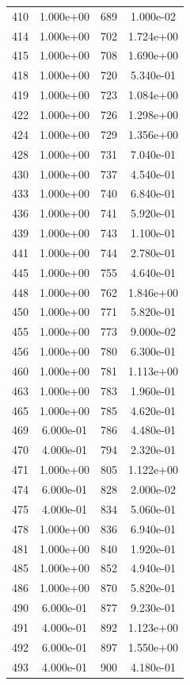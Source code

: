 \documentclass[12pt]{article}
\begin{document}
\begin{longtable}{@{}cccc@{}}
410 & 1.000e+00 & 689 & 1.000e-02 \\
414 & 1.000e+00 & 702 & 1.724e+00 \\
415 & 1.000e+00 & 708 & 1.690e+00 \\
418 & 1.000e+00 & 720 & 5.340e-01 \\
419 & 1.000e+00 & 723 & 1.084e+00 \\
422 & 1.000e+00 & 726 & 1.298e+00 \\
424 & 1.000e+00 & 729 & 1.356e+00 \\
428 & 1.000e+00 & 731 & 7.040e-01 \\
430 & 1.000e+00 & 737 & 4.540e-01 \\
433 & 1.000e+00 & 740 & 6.840e-01 \\
436 & 1.000e+00 & 741 & 5.920e-01 \\
439 & 1.000e+00 & 743 & 1.100e-01 \\
441 & 1.000e+00 & 744 & 2.780e-01 \\
445 & 1.000e+00 & 755 & 4.640e-01 \\
448 & 1.000e+00 & 762 & 1.846e+00 \\
450 & 1.000e+00 & 771 & 5.820e-01 \\
455 & 1.000e+00 & 773 & 9.000e-02 \\
456 & 1.000e+00 & 780 & 6.300e-01 \\
460 & 1.000e+00 & 781 & 1.113e+00 \\
463 & 1.000e+00 & 783 & 1.960e-01 \\
465 & 1.000e+00 & 785 & 4.620e-01 \\
469 & 6.000e-01 & 786 & 4.480e-01 \\
470 & 4.000e-01 & 794 & 2.320e-01 \\
471 & 1.000e+00 & 805 & 1.122e+00 \\
474 & 6.000e-01 & 828 & 2.000e-02 \\
475 & 4.000e-01 & 834 & 5.060e-01 \\
478 & 1.000e+00 & 836 & 6.940e-01 \\
481 & 1.000e+00 & 840 & 1.920e-01 \\
485 & 1.000e+00 & 852 & 4.940e-01 \\
486 & 1.000e+00 & 870 & 5.820e-01 \\
490 & 6.000e-01 & 877 & 9.230e-01 \\
491 & 4.000e-01 & 892 & 1.123e+00 \\
492 & 6.000e-01 & 897 & 1.550e+00 \\
493 & 4.000e-01 & 900 & 4.180e-01 \\

\end{longtable}
\end{document}
